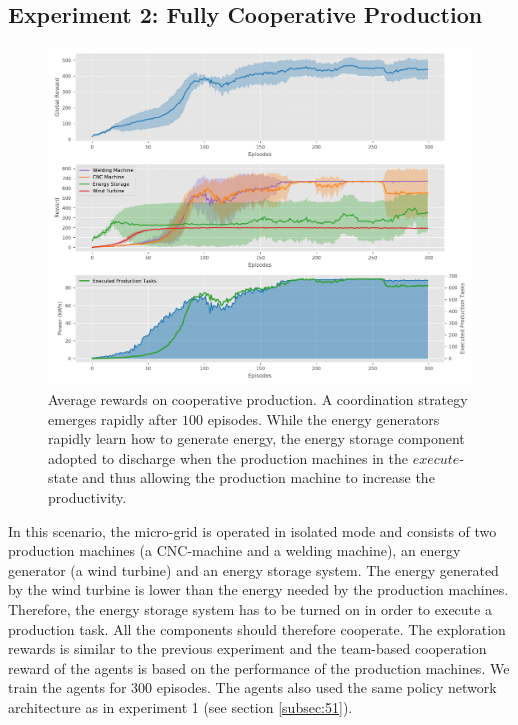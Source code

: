 \subsection{Experiment 2: Fully Cooperative Production}
\label{subsec:52}

%
\begin{figure}[h!]
\sidecaption
\includegraphics[scale=.48]{images/experiment_2_results}
%
%
\caption{Average rewards on cooperative production. A coordination strategy emerges rapidly after $100$ episodes. While the energy generators rapidly learn how to generate energy, the energy storage component adopted to discharge when the production machines in the $execute$-state and thus allowing the production machine to increase the productivity.}
\label{fig:scenario_2_results}       %
\end{figure}

In this scenario, the micro-grid is operated in isolated mode and consists of two production machines (a CNC-machine and a welding machine), an energy generator (a wind turbine) and an energy storage system. The energy generated by the wind turbine is lower than the energy needed by the production machines. Therefore, the energy storage system has to be turned on in order to execute a production task. All the components should therefore cooperate. The exploration rewards is similar to the previous experiment and the team-based cooperation reward of the agents is based on the performance of the production machines. We train the agents for $300$ episodes. The agents also used the same policy network architecture as in experiment 1 (see section \ref{subsec:51}).

